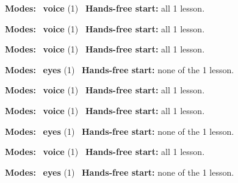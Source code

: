 \expandafter\def\csname hlchaptermodality186\endcsname{%
  {\small\noindent
    \textbf{Modes:} \hlvoicesign{}~\textbf{voice} (1)\quad
    \hlvoicesign{}~\textbf{Hands-free start:} all 1 lesson.%
    \par}\medskip
}

\expandafter\def\csname hlchaptermodality187\endcsname{%
  {\small\noindent
    \textbf{Modes:} \hlvoicesign{}~\textbf{voice} (1)\quad
    \hlvoicesign{}~\textbf{Hands-free start:} all 1 lesson.%
    \par}\medskip
}

\expandafter\def\csname hlchaptermodality188\endcsname{%
  {\small\noindent
    \textbf{Modes:} \hlvoicesign{}~\textbf{voice} (1)\quad
    \hlvoicesign{}~\textbf{Hands-free start:} all 1 lesson.%
    \par}\medskip
}

\expandafter\def\csname hlchaptermodality189\endcsname{%
  {\small\noindent
    \textbf{Modes:} \hlsightsign{}~\textbf{eyes} (1)\quad
    \hlvoicesign{}~\textbf{Hands-free start:} none of the 1 lesson.%
    \par}\medskip
}

\expandafter\def\csname hlchaptermodality190\endcsname{%
  {\small\noindent
    \textbf{Modes:} \hlvoicesign{}~\textbf{voice} (1)\quad
    \hlvoicesign{}~\textbf{Hands-free start:} all 1 lesson.%
    \par}\medskip
}

\expandafter\def\csname hlchaptermodality191\endcsname{%
  {\small\noindent
    \textbf{Modes:} \hlvoicesign{}~\textbf{voice} (1)\quad
    \hlvoicesign{}~\textbf{Hands-free start:} all 1 lesson.%
    \par}\medskip
}

\expandafter\def\csname hlchaptermodality192\endcsname{%
  {\small\noindent
    \textbf{Modes:} \hlsightsign{}~\textbf{eyes} (1)\quad
    \hlvoicesign{}~\textbf{Hands-free start:} none of the 1 lesson.%
    \par}\medskip
}

\expandafter\def\csname hlchaptermodality193\endcsname{%
  {\small\noindent
    \textbf{Modes:} \hlvoicesign{}~\textbf{voice} (1)\quad
    \hlvoicesign{}~\textbf{Hands-free start:} all 1 lesson.%
    \par}\medskip
}

\expandafter\def\csname hlchaptermodality194\endcsname{%
  {\small\noindent
    \textbf{Modes:} \hlsightsign{}~\textbf{eyes} (1)\quad
    \hlvoicesign{}~\textbf{Hands-free start:} none of the 1 lesson.%
    \par}\medskip
}


